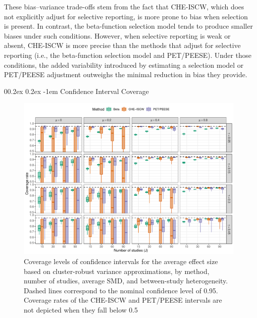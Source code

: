 \documentclass[
  american,
  man, donotrepeattitle,floatsintext]{apa7}
\makeatletter
\let\oldparagraph\paragraph
\renewcommand{\paragraph}{
    \@ifstar
      \xxxParagraphStar
      \xxxParagraphNoStar
  }
\newcommand{\xxxParagraphStar}[1]{\oldparagraph*{#1}\mbox{}}
\newcommand{\xxxParagraphNoStar}[1]{\oldparagraph{#1}\mbox{}}
\renewcommand{\paragraph}{\@startsection{paragraph}{4}{\parindent}%
  {0\baselineskip \@plus 0.2ex \@minus 0.2ex}%
  {-1em}%
  {\normalfont\normalsize\bfseries\itshape\typesectitle}}
\makeatother
\begin{document}
These bias--variance trade-offs stem from the fact that CHE-ISCW, which does not explicitly adjust for selective reporting, is more prone to bias when selection is present. In contrast, the beta-function selection model tends to produce smaller biases under such conditions. However, when selective reporting is weak or absent, CHE-ISCW is more precise than the methods that adjust for selective reporting (i.e., the beta-function selection model and PET/PEESE). Under those conditions, the added variability introduced by estimating a selection model or PET/PEESE adjustment outweighs the minimal reduction in bias they provide.

\paragraph{Confidence Interval Coverage}\label{confidence-interval-coverage}

\begin{figure}
\includegraphics{beta-function-selection-models-with-dependent-effects_files/figure-latex/comparison-coverage-main-1} \caption{Coverage levels of confidence intervals for the average effect size based on cluster-robust variance approximations, by method, number of studies, average SMD, and between-study heterogeneity. Dashed lines correspond to the nominal confidence level of 0.95. Coverage rates of the CHE-ISCW and PET/PEESE intervals are not depicted when they fall below 0.5}\label{fig:comparison-coverage-main}
\end{figure}
\end{document}
